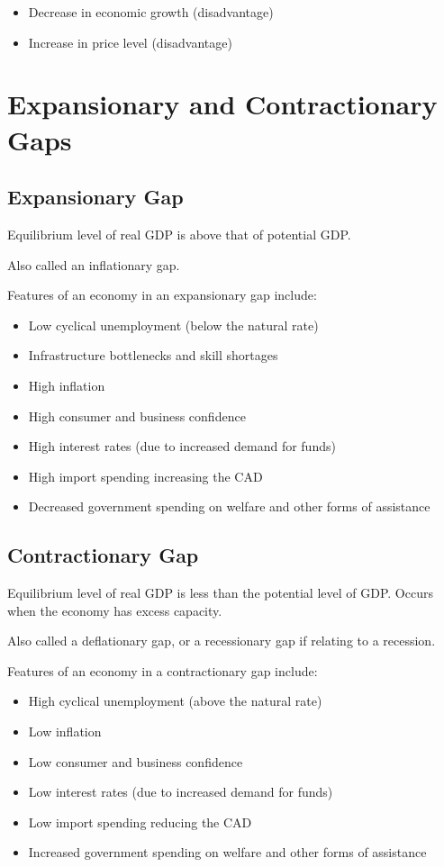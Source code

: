 \documentclass[a4paper,11pt]{article}
\begin{document}
\begin{itemize}
\item Decrease in economic growth (disadvantage)
\item Increase in price level (disadvantage)
\end{itemize}




\section{Expansionary and Contractionary Gaps}

\subsection{Expansionary Gap}

Equilibrium level of real GDP is above that of potential GDP.

Also called an inflationary gap.

Features of an economy in an expansionary gap include:

\begin{itemize}
\item Low cyclical unemployment (below the natural rate)
\item Infrastructure bottlenecks and skill shortages
\item High inflation
\item High consumer and business confidence
\item High interest rates (due to increased demand for funds)
\item High import spending increasing the CAD
\item Decreased government spending on welfare and other forms of assistance
\end{itemize}


\subsection{Contractionary Gap}

Equilibrium level of real GDP is less than the potential level of GDP. Occurs
when the economy has excess capacity.

Also called a deflationary gap, or a recessionary gap if relating to a
recession.

Features of an economy in a contractionary gap include:

\begin{itemize}
\item High cyclical unemployment (above the natural rate)
\item Low inflation
\item Low consumer and business confidence
\item Low interest rates (due to increased demand for funds)
\item Low import spending reducing the CAD
\item Increased government spending on welfare and other forms of assistance
\end{itemize}
\end{document}
